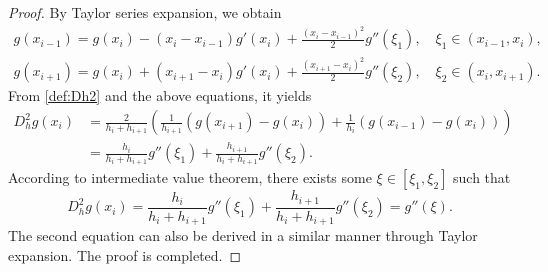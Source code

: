 \documentclass{amsart}
\theoremstyle{definition}
\theoremstyle{remark}
\numberwithin{equation}{section}
\begin{document}
\begin{proof}
  By Taylor series expansion, we obtain
  \begin{gather*}
    g(x_{i-1}) = g(x_{i}) - (x_{i}-x_{i-1}) g'(x_{i}) + \frac{(x_{i}-x_{i-1})^2}{2} g''(\xi_1), \quad \xi_1 \in (x_{i-1}, x_{i}),        \\
    g(x_{i+1}) = g(x_{i}) + (x_{i+1}-x_{i}) g'(x_{i}) + \frac{(x_{i+1}-x_{i})^2}{2} g''(\xi_2), \quad \xi_2 \in (x_{i}, x_{i+1}).
  \end{gather*}
  From \eqref{def:Dh2} and the above equations, it yields
  \begin{equation*}
    \begin{aligned}
      D_h^2 g(x_i) & = \frac{2}{h_i + h_{i+1}} \left( \frac{1}{h_{i+1}} \left(g(x_{i+1})-g(x_i)\right)  + \frac{1}{h_{i}} \left(g(x_{i-1})-g(x_i)\right) \right) \\
      &= \frac{h_i}{h_i + h_{i+1}} g''(\xi_1) + \frac{h_{i+1}}{h_i + h_{i+1}} g''(\xi_2)  .
    \end{aligned}
  \end{equation*}
  According to intermediate value theorem, there exists some \(\xi \in [\xi_1, \xi_2]\) such that
  \begin{equation*}
    D_h^2 g(x_i) = \frac{h_i}{h_i + h_{i+1}} g''(\xi_1) + \frac{h_{i+1}}{h_i + h_{i+1}} g''(\xi_2) = g''(\xi).
  \end{equation*}
  The second equation can also be derived in a similar manner through Taylor expansion. 
  The proof is completed.
\end{proof}
\end{document}
